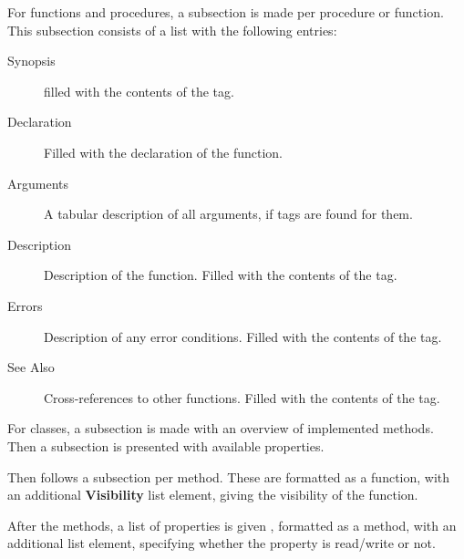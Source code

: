 For functions and procedures, a subsection is made per procedure or
function. This subsection consists of a list with the following entries:
\begin{description}
\item[Synopsis] filled with the contents of the  tag.
\item[Declaration] Filled with the declaration of the function.
\item[Arguments] A tabular description of all arguments, if  tags
are found for them.
\item[Description] Description of the function. Filled with the contents of
the  tag.
\item[Errors] Description of any error conditions. Filled with the contents
of the  tag.
\item[See Also] Cross-references to other functions. Filled with the
contents of the  tag.
\end{description}

For classes, a subsection is made with an overview of implemented methods.
Then a subsection is presented with available properties. 

Then follows a subsection per method. These are formatted as a function, with an
additional \textbf{Visibility} list element, giving the visibility of the
function.

After the methods, a list of properties is given , formatted as a method,
with an additional  list element, specifying whether the
property is read/write or not.

